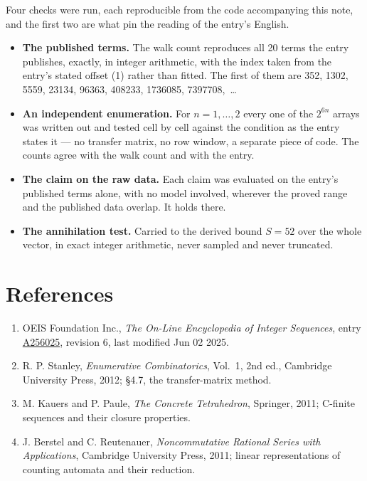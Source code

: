 \documentclass[11pt]{article}
\theoremstyle{definition}
\begin{document}
Four checks were run, each reproducible from the code accompanying this note, and the first two are what pin the reading of the entry's English.

\begin{itemize}

\item {\bfseries The published terms.} The walk count reproduces all 20 terms the entry publishes, exactly, in integer arithmetic, with the index taken from the entry's stated offset (1) rather than fitted. The first of them are 352, 1302, 5559, 23134, 96363, 408233, 1736085, 7397708,~\dots

\item {\bfseries An independent enumeration.} For $n = 1,\dots,2$ every one of the $2^{6n}$ arrays was written out and tested cell by cell against the condition as the entry states it --- no transfer matrix, no row window, a separate piece of code. The counts agree with the walk count and with the entry.

\item {\bfseries The claim on the raw data.} Each claim was evaluated on the entry's published terms alone, with no model involved, wherever the proved range and the published data overlap. It holds there.

\item {\bfseries The annihilation test.} Carried to the derived bound $S = 52$ over the whole vector, in exact integer arithmetic, never sampled and never truncated.

\end{itemize}

\section{References}

\begin{enumerate}

\item OEIS Foundation Inc., \emph{The On-Line Encyclopedia of Integer Sequences}, entry \href{https://oeis.org/A256025}{A256025}, revision 6, last modified Jun 02 2025.

\item R. P. Stanley, \emph{Enumerative Combinatorics}, Vol.~1, 2nd ed., Cambridge University Press, 2012; \S4.7, the transfer-matrix method.

\item M. Kauers and P. Paule, \emph{The Concrete Tetrahedron}, Springer, 2011; C-finite sequences and their closure properties.

\item J. Berstel and C. Reutenauer, \emph{Noncommutative Rational Series with Applications}, Cambridge University Press, 2011; linear representations of counting automata and their reduction.

\end{enumerate}
\end{document}
